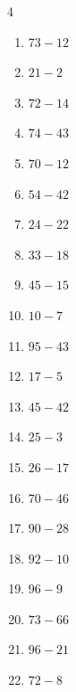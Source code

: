 \begin{multicols}{4}
\begin{enumerate}
  \item $73-12$
        \phantom{$=61$}

  \item $21-2$
        \phantom{$=19$}

  \item $72-14$
        \phantom{$=58$}

  \item $74-43$
        \phantom{$=31$}

  \item $70-12$
        \phantom{$=58$}

  \item $54-42$
        \phantom{$=12$}

  \item $24-22$
        \phantom{$=2$}

  \item $33-18$
        \phantom{$=15$}

  \item $45-15$
        \phantom{$=30$}

  \item $10-7$
        \phantom{$=3$}

  \item $95-43$
        \phantom{$=52$}

\columnbreak %

  \item $17-5$
        \phantom{$=12$}

  \item $45-42$
        \phantom{$=3$}

  \item $25-3$
        \phantom{$=22$}

  \item $26-17$
        \phantom{$=9$}

  \item $70-46$
        \phantom{$=24$}

  \item $90-28$
        \phantom{$=62$}

  \item $92-10$
        \phantom{$=82$}

  \item $96-9$
        \phantom{$=87$}

  \item $73-66$
        \phantom{$=7$}

  \item $96-21$
        \phantom{$=75$}

  \item $72-8$
        \phantom{$=64$}


\end{enumerate}
\end{multicols}
